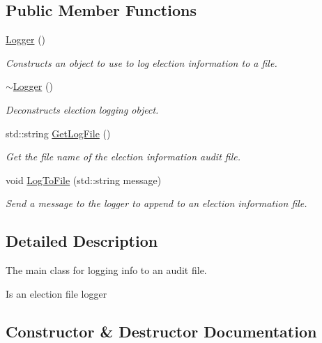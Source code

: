 \subsection*{Public Member Functions}
\begin{DoxyCompactItemize}
\item 
\hyperlink{classLogger_abc41bfb031d896170c7675fa96a6b30c}{Logger} ()
\begin{DoxyCompactList}\small\item\em Constructs an object to use to log election information to a file. \end{DoxyCompactList}\item 
\mbox{\label{classLogger_acb668a9e186a25fbaad2e4af6d1ed00a}} 
\hyperlink{classLogger_acb668a9e186a25fbaad2e4af6d1ed00a}{$\sim$\+Logger} ()
\begin{DoxyCompactList}\small\item\em Deconstructs election logging object. \end{DoxyCompactList}\item 
\mbox{\label{classLogger_ad22a485469cc14c5266e5fda019aba4d}} 
std\+::string \hyperlink{classLogger_ad22a485469cc14c5266e5fda019aba4d}{Get\+Log\+File} ()
\begin{DoxyCompactList}\small\item\em Get the file name of the election information audit file. \end{DoxyCompactList}\item 
void \hyperlink{classLogger_adb535266f5ad2a27ce2bd589884f347b}{Log\+To\+File} (std\+::string message)
\begin{DoxyCompactList}\small\item\em Send a message to the logger to append to an election information file. \end{DoxyCompactList}\end{DoxyCompactItemize}


\subsection{Detailed Description}
The main class for logging info to an audit file. 

Is an election file logger 

\subsection{Constructor \& Destructor Documentation}
\mbox{\label{classLogger_abc41bfb031d896170c7675fa96a6b30c}} 

